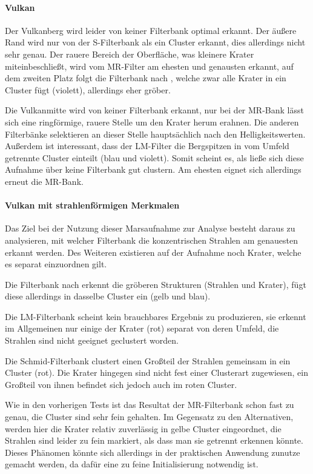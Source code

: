\paragraph{Vulkan}
Der Vulkanberg wird leider von keiner Filterbank optimal erkannt. Der äußere Rand wird nur von der S-Filterbank als ein Cluster erkannt, dies allerdings nicht sehr genau. Der rauere Bereich der Oberfläche, was kleinere Krater miteinbeschließt, wird vom MR-Filter am ehesten und genausten erkannt, auf dem zweiten Platz folgt die Filterbank nach \cite{jain_91}, welche zwar alle Krater in ein Cluster fügt (violett), allerdings eher gröber.

Die Vulkanmitte wird von keiner Filterbank erkannt, nur bei der MR-Bank lässt sich eine ringförmige, rauere Stelle um den Krater herum erahnen. Die anderen Filterbänke selektieren an dieser Stelle hauptsächlich nach den Helligkeitswerten. Außerdem ist interessant, dass der LM-Filter die Bergspitzen in vom Umfeld getrennte Cluster einteilt (blau und violett). Somit scheint es, als ließe sich diese Aufnahme über keine Filterbank gut clustern. Am ehesten eignet sich allerdings erneut die MR-Bank.

\paragraph{Vulkan mit strahlenförmigen Merkmalen}

Das Ziel bei der Nutzung dieser Marsaufnahme zur Analyse besteht daraus zu analysieren, mit welcher Filterbank die konzentrischen Strahlen am genauesten erkannt werden. Des Weiteren existieren auf der Aufnahme noch Krater, welche es separat einzuordnen gilt.

Die Filterbank nach \cite{jain_91} erkennt die gröberen Strukturen (Strahlen und Krater), fügt diese allerdings in dasselbe Cluster ein (gelb und blau).

Die LM-Filterbank scheint kein brauchbares Ergebnis zu produzieren, sie erkennt im Allgemeinen nur einige der Krater (rot) separat von deren Umfeld, die Strahlen sind nicht geeignet geclustert worden.

Die Schmid-Filterbank clustert einen Großteil der Strahlen gemeinsam in ein Cluster (rot). Die Krater hingegen sind nicht fest einer Clusterart zugewiesen, ein Großteil von ihnen befindet sich jedoch auch im roten Cluster.

Wie in den vorherigen Tests ist das Resultat der MR-Filterbank schon fast zu genau, die Cluster sind sehr fein gehalten. Im Gegensatz zu den Alternativen, werden hier die Krater relativ zuverlässig in gelbe Cluster eingeordnet, die Strahlen sind leider zu fein markiert, als dass man sie getrennt erkennen könnte. Dieses Phänomen könnte sich allerdings in der praktischen Anwendung zunutze gemacht werden, da dafür eine zu feine Initialisierung notwendig ist.

